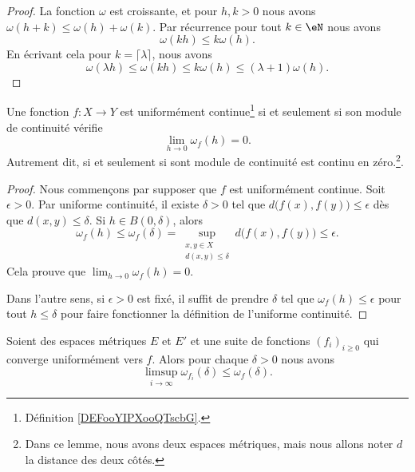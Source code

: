 \begin{proof}
	La fonction \( \omega\) est croissante, et pour \( h,k>0\) nous avons \( \omega(h+k)\leq\omega(h)+\omega(k)\). Par récurrence pour tout \( k\in \eN\) nous avons
	\begin{equation}
		\omega(kh)\leq k\omega(h).
	\end{equation}
	En écrivant cela pour \( k=\lceil \lambda\rceil\), nous avons
	\begin{equation}
		\omega(\lambda h)\leq \omega(kh)\leq k\omega(h)\leq (\lambda+1)\omega(h).
	\end{equation}
\end{proof}

\begin{lemma}   \label{LemeERapq}
	Une fonction \( f\colon X\to Y\) est uniformément continue\footnote{Définition \ref{DEFooYIPXooQTscbG}.} si et seulement si son module de continuité vérifie
	\begin{equation}
		\lim_{h\to 0} \omega_f(h)=0.
	\end{equation}
	Autrement dit, si et seulement si sont module de continuité est continu en zéro.\footnote{Dans ce lemme, nous avons deux espaces métriques, mais nous allons noter \( d\) la distance des deux côtés.}.
\end{lemma}

\begin{proof}
	Nous commençons par supposer que \( f\) est uniformément continue. Soit \( \epsilon>0\). Par uniforme continuité, il existe \( \delta>0\) tel que \( d\big( f(x),f(y) \big)\leq \epsilon\) dès que \( d(x,y)\leq \delta\). Si \( h\in B(0,\delta)\), alors
	\begin{equation}
		\omega_f(h)\leq \omega_f(\delta)=\sup_{\substack{x,y\in X\\d(x,y)\leq \delta}}d\big( f(x),f(y) \big)\leq \epsilon.
	\end{equation}
	Cela prouve que \( \lim_{h\to 0} \omega_f(h)=0\).

	Dans l'autre sens, si \( \epsilon>0\) est fixé, il suffit de prendre \( \delta\) tel que \( \omega_f(h)\leq \epsilon\) pour tout \( h\leq \delta\) pour faire fonctionner la définition de l'uniforme continuité.
\end{proof}

\begin{lemma}        \label{LEMooKPPSooPIncvn}
	Soient des espaces métriques \( E\) et \( E'\) et une suite de fonctions \( (f_i)_{i\geq 0}\) qui converge uniformément vers \( f\). Alors pour chaque \( \delta>0\) nous avons
	\begin{equation}
		\limsup_{i\to \infty}\omega_{f_i}(\delta)\leq \omega_f(\delta).
	\end{equation}
\end{lemma}

